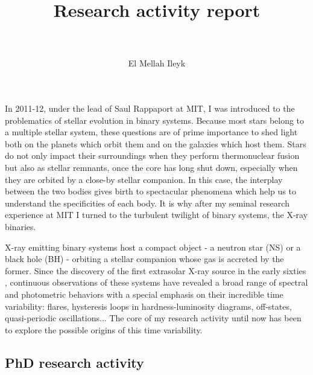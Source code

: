 \documentclass[a4paper,12pt,onecolumn]{article}
\title{	
\vspace*{-2cm}
\normalfont \tiny 
\horrule{0.5pt} \\[0.4cm] %
\huge Research activity report \\ %
\horrule{2pt} \\[0.5cm] %
}
\author{El Mellah Ileyk} %
\date{\tiny }%
\makeatletter
\newcommand*{\ns}{NS\@\xspace}
\newcommand*{\bh}{BH\@\xspace}
\makeatother
\begin{document}


\maketitle
\thispagestyle{empty}

In 2011-12, under the lead of Saul Rappaport at MIT, I was introduced to the problematics of stellar evolution in binary systems. Because most stars belong to a multiple stellar system, these questions are of prime importance to shed light both on the planets which orbit them and on the galaxies which host them. Stars do not only impact their surroundings when they perform thermonuclear fusion but also as stellar remnants, once the core has long shut down, especially when they are orbited by a close-by stellar companion. In this case, the interplay between the two bodies gives birth to spectacular phenomena which help us to understand the specificities of each body. It is why after my seminal research experience at MIT I turned to the turbulent twilight of binary systems, the X-ray binaries.

X-ray emitting binary systems host a compact object - a neutron star (\ns) or a black hole (\bh) - orbiting a stellar companion whose gas is accreted by the former. Since the discovery of the first extrasolar X-ray source in the early sixties \citep{Giacconi1962}, continuous observations of these systems have revealed a broad range of spectral and photometric behaviors with a special emphasis on their incredible time variability: flares, hysteresis loops in hardness-luminosity diagrams, off-states, quasi-periodic oscillations... The core of my research activity until now has been to explore the possible origins of this time variability. 


\subsection*{PhD research activity}
\end{document}
